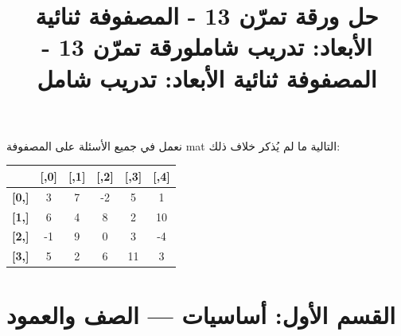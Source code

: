 \documentclass[14pt]{extarticle}
\title{حل ورقة تمرّن 13 - المصفوفة ثنائية الأبعاد: تدريب شامل}
\title{ورقة تمرّن 13 - المصفوفة ثنائية الأبعاد: تدريب شامل}
\begin{document}
\maketitle
\thispagestyle{fancy}

نعمل في جميع الأسئلة على المصفوفة \textenglish{mat} التالية ما لم يُذكر خلاف ذلك:

\begin{center}
\begin{english}
\begin{tabular}{c|ccccc}
 & \textbf{[,0]} & \textbf{[,1]} & \textbf{[,2]} & \textbf{[,3]} & \textbf{[,4]} \\
\hline
\textbf{[0,]} &  3 &  7 & -2 &  5 &  1 \\
\textbf{[1,]} &  6 &  4 &  8 &  2 & 10 \\
\textbf{[2,]} & -1 &  9 &  0 &  3 & -4 \\
\textbf{[3,]} &  5 &  2 &  6 & 11 &  3 \\
\end{tabular}
\end{english}
\end{center}

\section*{القسم الأول: أساسيات — الصف والعمود}
\end{document}
